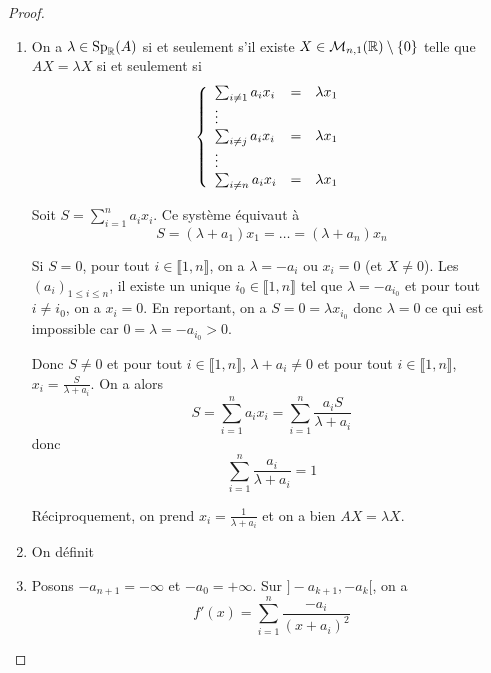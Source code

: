 \documentclass[12pt]{article}
\begin{document}
\begin{proof}
	\phantom{}
	\begin{enumerate}
		\item On a $\lambda\in\operatorname{Sp}_{\mathbb{R}}(A)$ si et seulement s'il existe $X\in\mathcal{M}_{n,1}(\mathbb{R})\setminus\lbrace0\rbrace$ telle que $AX=\lambda X$ si et seulement si 
		\begin{equation}
			\left\lbrace
				\begin{array}[]{lll}
					\sum_{i\neq 1}a_{i}x_{i}&=&\lambda x_{1}\\
					\vdots\\
					\sum_{i\neq j}a_{i}x_{i}&=&\lambda x_{1}\\
					\vdots\\
					\sum_{i\neq n}a_{i}x_{i}&=&\lambda x_{1}\\
				\end{array}
			\right.
		\end{equation}

		Soit $S=\sum_{i=1}^{n}a_{i}x_{i}$. Ce système équivaut à 
		\begin{equation}
			S=(\lambda+a_{1})x_{1}=\dots=(\lambda+a_{n})x_{n}
		\end{equation}

		Si $S=0$, pour tout $i\in\llbracket1,n\rrbracket$, on a $\lambda=-a_{i}$ ou $x_{i}=0$ (et $X\neq0$). Les $(a_{i})_{1\leqslant i\leqslant n}$, il existe un unique $i_{0}\in\llbracket1,n\rrbracket$ tel que $\lambda=-a_{i_{0}}$ et pour tout $i\neq i_{0}$, on a $x_{i}=0$. En reportant, on a $S=0=\lambda x_{i_{0}}$ donc $\lambda=0$ ce qui est impossible car $0=\lambda=-a_{i_{0}}>0$.

		Donc $S\neq0$ et pour tout $i\in\llbracket1,n\rrbracket$, $\lambda+a_{i}\neq0$ et pour tout $i\in\llbracket1,n\rrbracket$, $x_{i}=\frac{S}{\lambda+a_{i}}$. On a alors 
		\begin{equation}
			S=\sum_{i=1}^{n}a_{i}x_{i}=\sum_{i=1}^{n}\frac{a_{i}S}{\lambda+a_{i}}
		\end{equation}
		donc 
		\begin{equation}
			\boxed{
				\sum_{i=1}^{n}\frac{a_{i}}{\lambda+a_{i}}=1
			}
		\end{equation}

		Réciproquement, on prend $x_{i}=\frac{1}{\lambda+a_{i}}$ et on a bien $AX=\lambda X$.

		\item On définit 
		\item Posons $-a_{n+1}=-\infty$ et $-a_{0}=+\infty$. Sur $]-a_{k+1},-a_{k}[$, on a 
		\begin{equation}
			f'(x)=\sum_{i=1}^{n}\frac{-a_{i}}{(x+a_{i})^{2}}	
		\end{equation}


\end{enumerate}
\end{proof}
\end{document}
